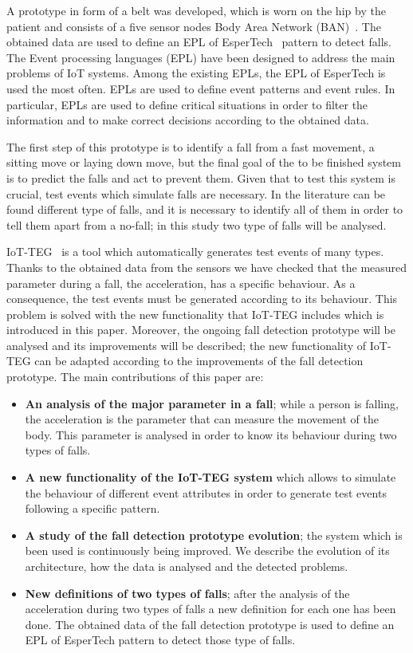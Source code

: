 \documentclass[conference]{IEEEtran}
\theoremstyle{definition}
\begin{document}
A prototype in form of a belt was developed, which is worn on the hip by the patient and consists 
of a five sensor nodes Body Area Network (BAN)~\cite{LaBlunda.2016,LaBlunda.2016b}. The obtained 
data are used to define an EPL of EsperTech~\cite{Esper:2016} pattern to detect falls. The Event 
processing languages (EPL) have been designed to address the main problems of IoT systems. Among 
the existing EPLs, the EPL of EsperTech is used the most often. EPLs are used to define event patterns 
and event rules. In particular, EPLs are used to define critical situations
in order to filter the information and to make correct decisions according to the obtained data.

The first step of this prototype is to identify a fall from a fast movement, a sitting move or laying 
down move, but the final goal of the to be finished system is to predict the falls and act to prevent 
them. Given that to test this system is crucial, test events which simulate falls are necessary. In 
the literature can be found different type of falls, and it is necessary to identify all of them in 
order to tell them apart from a no-fall; in this study two type of falls will be analysed. 

IoT-TEG~\cite{TesisGutierrez2017,Gutierrez2017} is a tool which automatically generates test events 
of many types. Thanks to the obtained data from the sensors we have checked that the measured 
parameter during a fall, the acceleration, has a specific behaviour. As a consequence, the test events 
must be generated according to its behaviour. This problem is solved with the new functionality that 
IoT-TEG includes which is introduced in this paper. Moreover, the ongoing fall detection prototype will 
be analysed and its improvements will be described; the new functionality of IoT-TEG can be adapted 
according to the improvements of the fall detection prototype. The main contributions of this paper are:

\begin{itemize}
 \item \textbf{An analysis of the major parameter in a fall}; while a person is falling, the acceleration 
 is the parameter that can measure the movement of the body. This parameter is analysed in order to know 
 its behaviour during two types of falls.
 \item \textbf{A new functionality of the IoT-TEG system} which allows to simulate the behaviour of 
 different event attributes in order to generate test events following a specific pattern.
 \item \textbf{A study of the fall detection prototype evolution}; the system which is been used is
 continuously being improved. We describe the evolution of its architecture, how the data is analysed and 
 the detected problems.
 \item \textbf{New definitions of two types of falls}; after the analysis of the acceleration during two 
 types of falls a new definition for each one has been done. The obtained data of the fall detection 
 prototype is used to define an EPL of EsperTech pattern to detect those type of falls. 
\end{itemize}
\end{document}
